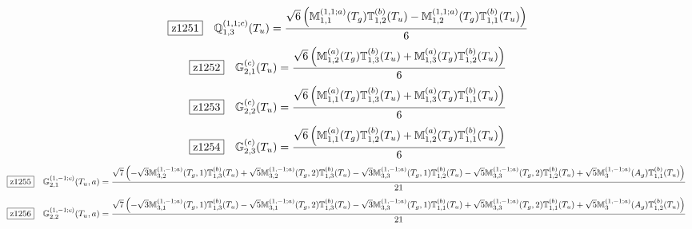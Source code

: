 \documentclass[fleqn,10pt,landscape]{jsarticle}
\begin{document}
\begin{dmath*}
\hspace*{3mm}\fbox{z1251}\quad \mathbb{Q}_{1,3}^{(1,1;c)}(T_{u})=\frac{\sqrt{6} \left(\mathbb{M}_{1,1}^{(1,1;a)}(T_{g}) \mathbb{T}_{1,2}^{(b)}(T_{u}) - \mathbb{M}_{1,2}^{(1,1;a)}(T_{g}) \mathbb{T}_{1,1}^{(b)}(T_{u})\right)}{6}
\end{dmath*}
\begin{dmath*}
\hspace*{3mm}\fbox{z1252}\quad \mathbb{G}_{2,1}^{(c)}(T_{u})=\frac{\sqrt{6} \left(\mathbb{M}_{1,2}^{(a)}(T_{g}) \mathbb{T}_{1,3}^{(b)}(T_{u}) + \mathbb{M}_{1,3}^{(a)}(T_{g}) \mathbb{T}_{1,2}^{(b)}(T_{u})\right)}{6}
\end{dmath*}
\begin{dmath*}
\hspace*{3mm}\fbox{z1253}\quad \mathbb{G}_{2,2}^{(c)}(T_{u})=\frac{\sqrt{6} \left(\mathbb{M}_{1,1}^{(a)}(T_{g}) \mathbb{T}_{1,3}^{(b)}(T_{u}) + \mathbb{M}_{1,3}^{(a)}(T_{g}) \mathbb{T}_{1,1}^{(b)}(T_{u})\right)}{6}
\end{dmath*}
\begin{dmath*}
\hspace*{3mm}\fbox{z1254}\quad \mathbb{G}_{2,3}^{(c)}(T_{u})=\frac{\sqrt{6} \left(\mathbb{M}_{1,1}^{(a)}(T_{g}) \mathbb{T}_{1,2}^{(b)}(T_{u}) + \mathbb{M}_{1,2}^{(a)}(T_{g}) \mathbb{T}_{1,1}^{(b)}(T_{u})\right)}{6}
\end{dmath*}
\begin{dmath*}
\hspace*{3mm}\fbox{z1255}\quad \mathbb{G}_{2,1}^{(1,-1;c)}(T_{u},a)=\frac{\sqrt{7} \left(- \sqrt{3} \mathbb{M}_{3,2}^{(1,-1;a)}(T_{g},1) \mathbb{T}_{1,3}^{(b)}(T_{u}) + \sqrt{5} \mathbb{M}_{3,2}^{(1,-1;a)}(T_{g},2) \mathbb{T}_{1,3}^{(b)}(T_{u}) - \sqrt{3} \mathbb{M}_{3,3}^{(1,-1;a)}(T_{g},1) \mathbb{T}_{1,2}^{(b)}(T_{u}) - \sqrt{5} \mathbb{M}_{3,3}^{(1,-1;a)}(T_{g},2) \mathbb{T}_{1,2}^{(b)}(T_{u}) + \sqrt{5} \mathbb{M}_{3}^{(1,-1;a)}(A_{g}) \mathbb{T}_{1,1}^{(b)}(T_{u})\right)}{21}
\end{dmath*}
\begin{dmath*}
\hspace*{3mm}\fbox{z1256}\quad \mathbb{G}_{2,2}^{(1,-1;c)}(T_{u},a)=\frac{\sqrt{7} \left(- \sqrt{3} \mathbb{M}_{3,1}^{(1,-1;a)}(T_{g},1) \mathbb{T}_{1,3}^{(b)}(T_{u}) - \sqrt{5} \mathbb{M}_{3,1}^{(1,-1;a)}(T_{g},2) \mathbb{T}_{1,3}^{(b)}(T_{u}) - \sqrt{3} \mathbb{M}_{3,3}^{(1,-1;a)}(T_{g},1) \mathbb{T}_{1,1}^{(b)}(T_{u}) + \sqrt{5} \mathbb{M}_{3,3}^{(1,-1;a)}(T_{g},2) \mathbb{T}_{1,1}^{(b)}(T_{u}) + \sqrt{5} \mathbb{M}_{3}^{(1,-1;a)}(A_{g}) \mathbb{T}_{1,2}^{(b)}(T_{u})\right)}{21}
\end{dmath*}
\end{document}
